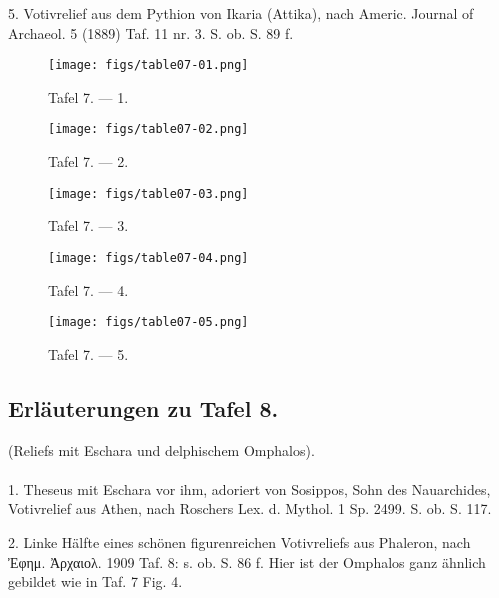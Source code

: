 \documentclass[a4paper, 11pt, oneside]{article}
\begin{document}
5. Votivrelief aus dem Pythion von Ikaria (Attika), nach Americ. Journal of Archaeol. 5 (1889) Taf. 11 nr. 3. S. ob. S. 89 f.
\clearpage
\vspace*{\fill}
\begin{figure}[H]
\centering
\texttt{[image: figs/table07-01.png]}
\caption{Tafel 7. --- 1.}
\end{figure}
\vspace*{\fill}
\clearpage
\vspace*{\fill}
\begin{figure}[H]
\centering
\texttt{[image: figs/table07-02.png]}
\caption{Tafel 7. --- 2.}
\end{figure}
\vspace*{\fill}
\clearpage
\vspace*{\fill}
\begin{figure}[H]
\centering
\texttt{[image: figs/table07-03.png]}
\caption{Tafel 7. --- 3.}
\end{figure}
\vspace*{\fill}
\clearpage
\vspace*{\fill}
\begin{figure}[H]
\centering
\texttt{[image: figs/table07-04.png]}
\caption{Tafel 7. --- 4.}
\end{figure}
\vspace*{\fill}
\clearpage
\vspace*{\fill}
\begin{figure}[H]
\centering
\texttt{[image: figs/table07-05.png]}
\caption{Tafel 7. --- 5.}
\end{figure}
\vspace*{\fill}
\clearpage
\subsection{Erläuterungen zu Tafel 8.}
\begin{center}
(Reliefs mit Eschara und delphischem Omphalos).
\end{center}
\paragraph{}
1. Theseus mit Eschara vor ihm, adoriert von Sosippos, Sohn des Nauarchides, Votivrelief aus Athen, nach Roschers Lex. d. Mythol. 1 Sp. 2499. S. ob. S. 117.

2. Linke Hälfte eines schönen figurenreichen Votivreliefs aus Phaleron, nach Ἐφημ. Ἀρχαιολ. 1909 Taf. 8: s. ob. S. 86 f. Hier ist der Omphalos ganz ähnlich gebildet wie in Taf. 7 Fig. 4.
\end{document}
